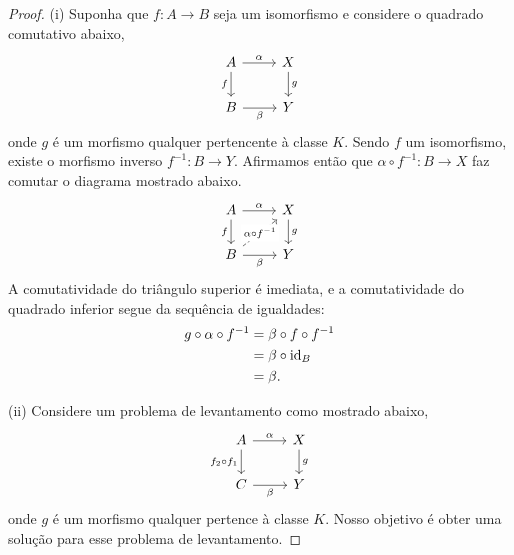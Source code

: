 \begin{proof}
  (i) Suponha que $f: A \to B$ seja um isomorfismo e considere o quadrado comutativo abaixo,
  \begin{displaymath}
    \begin{tikzcd}
      A
      \arrow[r, "\alpha"]
      \arrow[d, "f" swap]
      & X
      \arrow[d, "g"]
      \\ B
      \arrow[r, "\beta" swap]
      & Y
    \end{tikzcd}
  \end{displaymath}
  onde $g$ é um morfismo qualquer pertencente à classe $K$.
  Sendo $f$ um isomorfismo, existe o morfismo inverso $f^{-1}: B \to Y$.
  Afirmamos então que $\alpha \circ f^{-1}: B \to X$ faz comutar o diagrama mostrado abaixo.
  \begin{displaymath}
    \begin{tikzcd}
      A
      \arrow[r, "\alpha"]
      \arrow[d, "f" swap]
      & X
      \arrow[d, "g"]
      \\ B
      \arrow[r, "\beta" swap]
      \arrow[ru, dashed, "\alpha \circ f^{-1}" description]
      & Y
    \end{tikzcd}
  \end{displaymath}
  A comutatividade do triângulo superior é imediata, e a comutatividade do quadrado inferior segue da sequência de igualdades:
  \begin{align*}
    g \circ \alpha \circ f^{-1}
    & = \beta \circ f \circ f^{-1} \\
    & = \beta \circ \mathrm{id}_B \\
    & = \beta.
  \end{align*}

  \smallskip
  (ii) Considere um problema de levantamento como mostrado abaixo,
  \begin{equation}\label{eq:comp_K-proj_diag_1}
    \begin{tikzcd}
      A
      \arrow[r, "\alpha"]
      \arrow[d, "f_2 \circ f_1" swap]
      & X
      \arrow[d, "g"]
      \\ C
      \arrow[r, "\beta" swap]
      & Y
    \end{tikzcd}
  \end{equation}
  onde $g$ é um morfismo qualquer pertence à classe $K$.
  Nosso objetivo é obter uma solução para esse problema de levantamento.


\end{proof}
